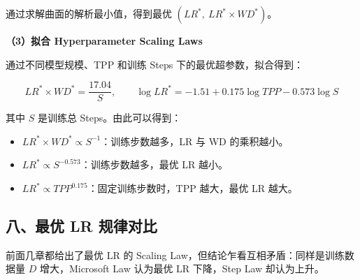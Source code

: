 \documentclass[
  11pt,
  a4paper,
  fontset=none]{ctexart}
\providecommand{\tightlist}{%
  \setlength{\itemsep}{0pt}\setlength{\parskip}{0pt}}
\newenvironment{NotesFormula}{%
  \par\noindent\begin{minipage}{\linewidth}%
  \setlength{\parindent}{2em}%
  \setlength{\parskip}{0.35em}%
}{\end{minipage}\par}
\begin{document}
通过求解曲面的解析最小值，得到最优 \((LR^*,\ LR^*\times WD^*)\)。

\textbf{（3）拟合 Hyperparameter Scaling Laws}

\begin{NotesFormula}

通过不同模型规模、TPP 和训练 Steps 下的最优超参数，拟合得到：

\[\boxed{LR^*\times WD^*=\frac{17.04}{S}},\qquad
\boxed{\log LR^*=-1.51+0.175\log TPP-0.573\log S}\]

\end{NotesFormula}

其中 \(S\) 是训练总 Steps。由此可以得到：

\begin{itemize}
\tightlist
\item
  \(LR^*\times WD^*\propto S^{-1}\)：训练步数越多，LR 与 WD 的乘积越小。
\item
  \(LR^*\propto S^{-0.573}\)：训练步数越多，最优 LR 越小。
\item
  \(LR^*\propto TPP^{0.175}\)：固定训练步数时，TPP 越大，最优 LR 越大。
\end{itemize}

\clearpage

\subsection{八、最优 LR
规律对比}\label{ux516bux6700ux4f18-lr-ux89c4ux5f8bux5bf9ux6bd4}

前面几章都给出了最优 LR 的 Scaling
Law，但结论乍看互相矛盾：同样是训练数据量 \(D\) 增大，Microsoft Law
认为最优 LR 下降，Step Law 却认为上升。
\end{document}
